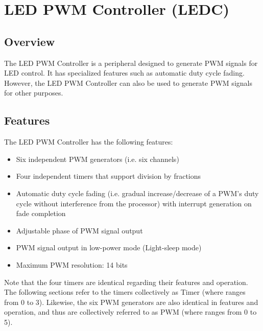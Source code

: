 \documentclass[main\_\_EN.tex]{subfiles}
\begin{document}

\ifglobal
\else
    {\let\clearpage\relax \listoftodos}
    \tableofcontents
\fi



\hypertarget{ledpwm}{}
\chapter{LED PWM Controller (LEDC)}
\label{mod:ledpwm}


\section{Overview}


The LED PWM Controller is a peripheral designed to generate PWM signals for LED control. It has specialized features such as automatic duty cycle fading. However, the LED PWM Controller can also be used to generate PWM signals for other purposes.

\section{Features}
The LED PWM Controller has the following features:
\begin{itemize}
    \item Six independent PWM generators (i.e. six channels)
    \item Four independent timers that support division by fractions
    \item Automatic duty cycle fading (i.e. gradual increase/decrease of a PWM's duty cycle without interference from the processor) with interrupt generation on fade completion
    \item Adjustable phase of PWM signal output
    \item PWM signal output in low-power mode (Light-sleep mode)
    \item Maximum PWM resolution: 14 bits
\end{itemize}

Note that the four timers are identical regarding their features and operation. The following sections refer to the timers collectively as Timer (where  ranges from 0 to 3). Likewise, the six PWM generators are also identical in features and operation, and thus are collectively referred to as PWM (where  ranges from 0 to 5).
\end{document}
